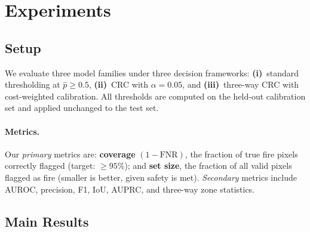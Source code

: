 \documentclass{article}
\begin{document}
\section{Experiments}
\label{sec:results}

\subsection{Setup}

We evaluate three model families under three decision frameworks:
\textbf{(i)}~standard thresholding at $\hat{p} \ge 0.5$,
\textbf{(ii)}~CRC with $\alpha = 0.05$, and
\textbf{(iii)}~three-way CRC with cost-weighted calibration.
All thresholds are computed on the held-out calibration set and applied unchanged to the test set.

\paragraph{Metrics.}
Our \emph{primary} metrics are:
\textbf{coverage} $(1{-}\mathrm{FNR})$, the fraction of true fire pixels correctly flagged (target: ${\ge}95\%$); and
\textbf{set size}, the fraction of all valid pixels flagged as fire (smaller is better, given safety is met).
\emph{Secondary} metrics include AUROC, precision, F1, IoU, AUPRC, and three-way zone statistics.

\subsection{Main Results}
\end{document}
